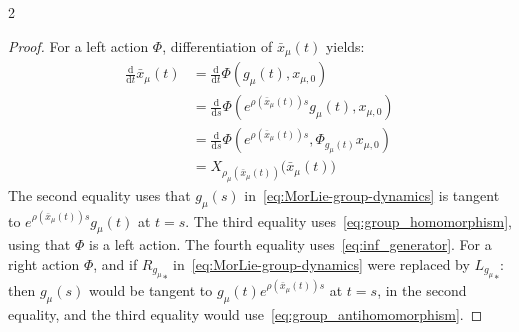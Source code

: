 \documentclass{article}
\newtheorem{proof}{Proof}[theorem]
\newcommand{\g}{\mathfrak{g}}                               %
\newcommand{\state}{x}
\newcommand{\appstate}{\bar{x}}
\newcommand{\ext}{\text{d}}                                 %
\begin{document}
\begin{multicols}{2}
\begin{proof}
    For a left action $\Phi$, differentiation of $\appstate_{\mu}(t)$ yields:
    \begin{align}
        \frac{\ext}{\ext t} \appstate_\mu(t) 
        &= \frac{\ext}{\ext t} \Phi(g_\mu(t), \state_{\mu,0}) \\ 
        & = \frac{\ext}{\ext s} \Phi(e^{\rho(\appstate_\mu(t)) s} g_\mu(t), \state_{\mu,0}) \\
        & = \frac{\ext}{\ext s} \Phi(e^{\rho(\appstate_\mu(t)) s}, \Phi_{g_\mu(t)} \state_{\mu,0}) \\
        & = X_{\rho_\mu(\appstate_\mu(t))}\big(\appstate_\mu(t)\big) 
    \end{align}
    The second equality uses that $g_\mu(s)$ in~\eqref{eq:MorLie-group-dynamics} is tangent to $e^{\rho(\appstate_\mu(t)) s}g_\mu(t)$ at $t = s$. The third equality uses~\eqref{eq:group_homomorphism}, using that $\Phi$ is a left action. The fourth equality uses~\eqref{eq:inf_generator}.
    For a right action $\Phi$, and if ${R_{g_\mu}}_*$ in~\eqref{eq:MorLie-group-dynamics} were replaced by ${L_{g_\mu}}_*$: then $g_\mu(s)$ would be tangent to $g_\mu(t)e^{\rho(\appstate_\mu(t))s}$ at $t = s$, in the second equality, and the third equality would use~\eqref{eq:group_antihomomorphism}. 
\end{proof}





\end{multicols}
\end{document}
